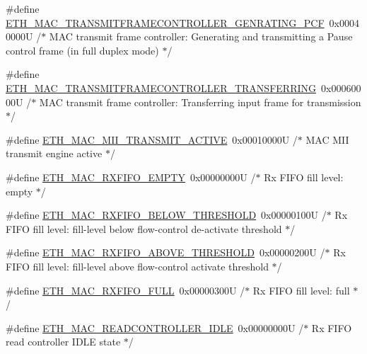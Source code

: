 \begin{DoxyCompactItemize}
\#define \hyperlink{group___h_a_l___e_t_h___aliased___defines_ga30f5421c685cc87345a62034f03e9ede}{E\+T\+H\+\_\+\+M\+A\+C\+\_\+\+T\+R\+A\+N\+S\+M\+I\+T\+F\+R\+A\+M\+E\+C\+O\+N\+T\+R\+O\+L\+L\+E\+R\+\_\+\+G\+E\+N\+R\+A\+T\+I\+N\+G\+\_\+\+P\+CF}~0x00040000\+U  /$\ast$ M\+A\+C transmit frame controller\+: Generating and transmitting a Pause control frame (in full duplex mode) $\ast$/
\item 
\#define \hyperlink{group___h_a_l___e_t_h___aliased___defines_ga813acc11409391a70e9c8f4e2c769cf1}{E\+T\+H\+\_\+\+M\+A\+C\+\_\+\+T\+R\+A\+N\+S\+M\+I\+T\+F\+R\+A\+M\+E\+C\+O\+N\+T\+R\+O\+L\+L\+E\+R\+\_\+\+T\+R\+A\+N\+S\+F\+E\+R\+R\+I\+NG}~0x00060000\+U  /$\ast$ M\+A\+C transmit frame controller\+: Transferring input frame for transmission $\ast$/
\item 
\#define \hyperlink{group___h_a_l___e_t_h___aliased___defines_ga569a78f6147f1068ddeed3897776b6f3}{E\+T\+H\+\_\+\+M\+A\+C\+\_\+\+M\+I\+I\+\_\+\+T\+R\+A\+N\+S\+M\+I\+T\+\_\+\+A\+C\+T\+I\+VE}~0x00010000\+U  /$\ast$ M\+A\+C M\+I\+I transmit engine active $\ast$/
\item 
\#define \hyperlink{group___h_a_l___e_t_h___aliased___defines_gab0663cbb0510f2d3bdc9fdaea103725e}{E\+T\+H\+\_\+\+M\+A\+C\+\_\+\+R\+X\+F\+I\+F\+O\+\_\+\+E\+M\+P\+TY}~0x00000000\+U  /$\ast$ Rx F\+I\+F\+O fill level\+: empty $\ast$/
\item 
\#define \hyperlink{group___h_a_l___e_t_h___aliased___defines_ga1ac34f74c22709a45510fe557e6b1866}{E\+T\+H\+\_\+\+M\+A\+C\+\_\+\+R\+X\+F\+I\+F\+O\+\_\+\+B\+E\+L\+O\+W\+\_\+\+T\+H\+R\+E\+S\+H\+O\+LD}~0x00000100\+U  /$\ast$ Rx F\+I\+F\+O fill level\+: fill-\/level below flow-\/control de-\/activate threshold $\ast$/
\item 
\#define \hyperlink{group___h_a_l___e_t_h___aliased___defines_ga10d4ac5728fe85efe0ec19699e4c90f0}{E\+T\+H\+\_\+\+M\+A\+C\+\_\+\+R\+X\+F\+I\+F\+O\+\_\+\+A\+B\+O\+V\+E\+\_\+\+T\+H\+R\+E\+S\+H\+O\+LD}~0x00000200\+U  /$\ast$ Rx F\+I\+F\+O fill level\+: fill-\/level above flow-\/control activate threshold $\ast$/
\item 
\#define \hyperlink{group___h_a_l___e_t_h___aliased___defines_gaa7b77138ec3256a713a8aa74ea94f0c1}{E\+T\+H\+\_\+\+M\+A\+C\+\_\+\+R\+X\+F\+I\+F\+O\+\_\+\+F\+U\+LL}~0x00000300\+U  /$\ast$ Rx F\+I\+F\+O fill level\+: full $\ast$/
\item 
\#define \hyperlink{group___h_a_l___e_t_h___aliased___defines_ga0be388dadd31f6a12f2ee9b4ee6c31bb}{E\+T\+H\+\_\+\+M\+A\+C\+\_\+\+R\+E\+A\+D\+C\+O\+N\+T\+R\+O\+L\+L\+E\+R\+\_\+\+I\+D\+LE}~0x00000000\+U  /$\ast$ Rx F\+I\+F\+O read controller I\+D\+L\+E state $\ast$/

\end{DoxyCompactItemize}
